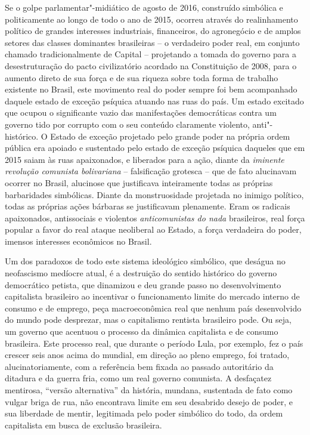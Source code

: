 Se o golpe parlamentar"-midiático de agosto de 2016, construído simbólica
e politicamente ao longo de todo o ano de 2015, ocorreu através do
realinhamento político de grandes interesses industriais, financeiros,
do agronegócio e de amplos setores das classes dominantes brasileiras --
o verdadeiro poder real, em conjunto chamado tradicionalmente de Capital
-- projetando a tomada do governo para a desestruturação do pacto
civilizatório acordado na Constituição de 2008, para o aumento direto de
sua força e de sua riqueza sobre toda forma de trabalho existente no
Brasil, este movimento real do poder sempre foi bem acompanhado daquele
estado de exceção psíquica atuando nas ruas do país. Um estado excitado
que ocupou o significante vazio das manifestações democráticas contra um
governo tido por corrupto com o seu conteúdo claramente violento,
anti"-histórico. O Estado de exceção projetado pelo grande poder na
própria ordem pública era apoiado e sustentado pelo estado de exceção
psíquica daqueles que em 2015 saiam às ruas apaixonados, e liberados
para a ação, diante da \emph{iminente revolução comunista bolivariana}
-- falsificação grotesca -- que de fato alucinavam ocorrer no Brasil,
alucinose que justificava inteiramente todas as próprias barbaridades
simbólicas. Diante da monstruosidade projetada no inimigo político,
todas as próprias ações bárbaras se justificavam plenamente. Eram os
radicais apaixonados, antissociais e violentos \emph{anticomunistas do
nada} brasileiros, real força popular a favor do real ataque neoliberal
ao Estado, a força verdadeira do poder, imensos interesses econômicos no
Brasil.

Um dos paradoxos de todo este sistema ideológico simbólico, que deságua
no neofascismo medíocre atual, é a destruição do sentido histórico do
governo democrático petista, que dinamizou e deu grande passo no
desenvolvimento capitalista brasileiro ao incentivar o funcionamento
limite do mercado interno de consumo e de emprego, peça macroeconômica
real que nenhum país desenvolvido do mundo pode desprezar, mas o
capitalismo rentista brasileiro pode. Ou seja, um governo que acentuou o
processo da dinâmica capitalista e de consumo brasileira. Este processo
real, que durante o período Lula, por exemplo, fez o país crescer seis
anos acima do  mundial, em direção ao pleno emprego, foi tratado,
alucinatoriamente, com a referência bem fixada ao passado autoritário da
ditadura e da guerra fria, como um real governo comunista. A desfaçatez
mentirosa, ``versão alternativa'' da história, mundana, sustentada de
fato como vulgar briga de rua, não encontrava limite em seu desabrido
desejo de poder, e sua liberdade de mentir, legitimada pelo poder
simbólico do todo, da ordem capitalista em busca de exclusão brasileira.

